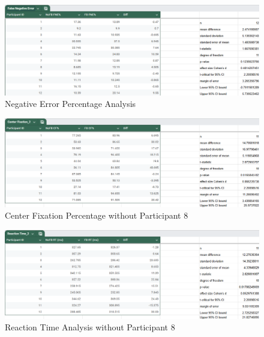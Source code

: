 \documentclass{l4proj}
\begin{document}
\begin{appendices}
\begin{figure}[!h]
    \centering
    \includegraphics[width=1\linewidth]{images//CSFYP data analysis/False Negative Error Pecentage Analysis.png}
    \caption{Negative Error Percentage Analysis}
    \label{fig:FNappendix}
\end{figure}

\begin{figure}[!h]
    \centering
    \includegraphics[width=1\linewidth]{images//CSFYP data analysis/Center Fixation Pecentage Analysis without Participant 8.png}
    \caption{Center Fixation Percentage without Participant 8}
    \label{fig:CFno8}
\end{figure}

\begin{figure}[!h]
    \centering
    \includegraphics[width=1\linewidth]{images//CSFYP data analysis/Reaction Time Analysis without Participant 8.png}
    \caption{Reaction Time Analysis without Participant 8}
    \label{fig:RTappendixno8}
\end{figure}


\end{appendices}
\end{document}
